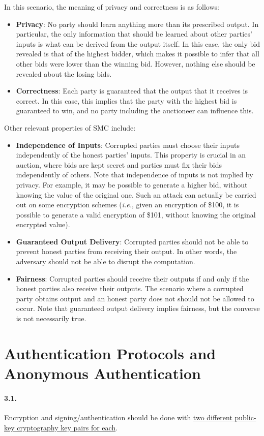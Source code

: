\documentclass[a4paper, 11pt]{article}
\begin{document}
In this scenario, the meaning of privacy and correctness is as follows:

\begin{itemize}
    \item \textbf{Privacy}: No party should learn anything more than its prescribed
    output. In particular, the only information that should be learned about other
    parties’ inputs is what can be derived from the output itself. In this case, the
    only bid revealed is that of the highest bidder, which makes it possible to infer
    that all other bids were lower than the winning bid. However, nothing else should
    be revealed about the losing bids.
    
    \item \textbf{Correctness}: Each party is guaranteed that the output that it
    receives is correct. In this case, this implies that the party with the highest
    bid is guaranteed to win, and no party including the auctioneer can influence this.
\end{itemize}

Other relevant properties of SMC include:

\begin{itemize}
    \item \textbf{Independence of Inputs}: Corrupted parties must choose their inputs
    independently of the honest parties’ inputs. This property is crucial in an 
    auction, where bids are kept secret and parties must fix their bids independently
    of others. Note that independence of inputs is not implied by privacy. For example,
    it may be possible to generate a higher bid, without knowing the value of the original
    one. Such an attack can actually be carried out on some encryption schemes (\textit{i.e.},
    given an encryption of \$100, it is possible to generate a valid encryption of \$101, without
    knowing the original encrypted value).
    
    \item \textbf{Guaranteed Output Delivery}: Corrupted parties should not be able to
    prevent honest parties from receiving their output. In other words, the adversary
    should not be able to disrupt the computation.
    
    \item \textbf{Fairness}: Corrupted parties should receive their outputs if and
    only if the honest parties also receive their outputs. The scenario where a
    corrupted party obtains output and an honest party does not should not be allowed
    to occur. Note that guaranteed output delivery implies fairness, but the converse
    is not necessarily true.  
\end{itemize}

\vspace{1.5\baselineskip}

\section{Authentication Protocols and Anonymous Authentication}

\paragraph{3.1.} Encryption and signing/authentication should be done with
\uline{two different public-key cryptography key pairs for each}.
\end{document}
